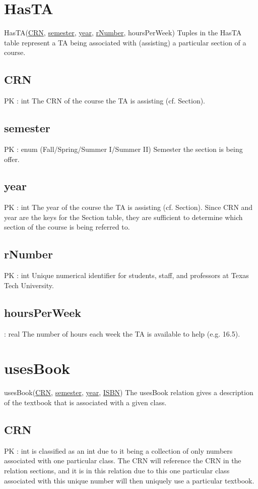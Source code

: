 \section{HasTA}
	HasTA(\underline{CRN}, \underline{semester}, \underline{year}, \underline{rNumber}, hoursPerWeek) 
		Tuples in the HasTA table represent a TA being associated with (assisting) a particular section of a course.
	
	\subsection{CRN}
		PK : int 
		The CRN of the course the TA is assisting (cf. Section).
	
	\subsection{semester}
		PK : enum (Fall/Spring/Summer I/Summer II)
		Semester the section is being offer.
			
	\subsection{year}
		PK : int 
		The year of the course the TA is assisting (cf. Section). Since CRN and year are the keys for the Section table, they are sufficient to determine which section of the course is being referred to.
	
	\subsection{rNumber}
		PK : int 
		Unique numerical identifier for students, staff, and professors at Texas Tech University.
	
	\subsection{hoursPerWeek}
		: real 
		The number of hours each week the TA is available to help (e.g. 16.5).


\section{usesBook}
	usesBook(\underline{CRN}, \underline{semester}, \underline{year}, \underline{ISBN}) 
		The usesBook relation gives a description of the textbook that is associated with a given class.
	
	\subsection{CRN}
 		PK : int 
 		is classified as an int due to it being a collection of only numbers associated with one particular class. The CRN will reference the CRN in the relation sections, and it is in this relation due to this one particular class associated with this unique number will then uniquely use a particular textbook.
	
